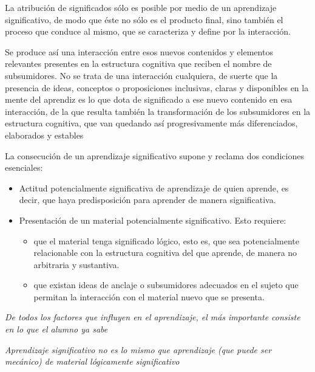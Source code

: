 \documentclass[12pt]{report}
\theoremstyle{largebreak}
\begin{document}
    La atribución de significados sólo es posible
    por medio de un aprendizaje significativo, de modo que éste no sólo es el producto
    final, sino también el proceso que conduce al mismo, que se caracteriza y define por la
    interacción.

    Se produce así una interacción entre esos nuevos
    contenidos y elementos relevantes presentes en la estructura cognitiva que reciben el
    nombre de subsumidores. No se trata de una interacción cualquiera, de suerte que la
    presencia de ideas, conceptos o proposiciones inclusivas, claras y disponibles en la
    mente del aprendiz es lo que dota de significado a ese nuevo contenido en esa
    interacción, de la que resulta también la transformación de los subsumidores en la
    estructura cognitiva, que van quedando así progresivamente más diferenciados,
    elaborados y estables

    La consecución de un aprendizaje
    significativo supone y reclama dos condiciones esenciales: 
    \begin{itemize}
        \item Actitud potencialmente significativa de aprendizaje de quien aprende, es decir, que haya predisposición para aprender de manera significativa.
        \item Presentación de un material potencialmente significativo. Esto requiere:
        \begin{itemize}
            \item que el material tenga significado lógico, esto es, que sea potencialmente relacionable con la estructura cognitiva del que aprende, de manera no arbitraria y sustantiva.
            \item que existan ideas de anclaje o subsumidores adecuados en el sujeto que permitan la interacción con el material nuevo que se presenta.
        \end{itemize}
    \end{itemize}

    \begin{center}
        \textit{De todos los factores que influyen en el aprendizaje, el más importante consiste en lo que el alumno ya sabe}
    \end{center}

    \begin{center}
        \textit{Aprendizaje significativo no es lo mismo que aprendizaje (que puede ser mecánico) de material lógicamente significativo}
    \end{center}
\end{document}
